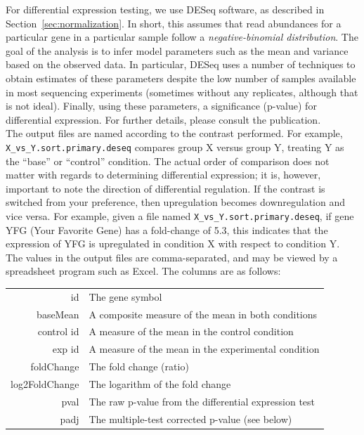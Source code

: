 \documentclass{article}
\begin{document}
{{{For differential expression testing, we use DESeq software, as described in Section~\ref{sec:normalization}.  In short, this assumes that read abundances for a particular gene in a particular sample follow a \emph{negative-binomial distribution}.  The goal of the analysis is to infer model parameters such as the mean and variance based on the observed data.  In particular, DESeq uses a number of techniques to obtain estimates of these parameters despite the low number of samples available in most sequencing experiments (sometimes without any replicates, although that is not ideal).  Finally, using these parameters, a significance (p-value) for differential expression. For further details, please consult the publication.\\  

The output files are named according to the contrast performed.  For example, \verb|X_vs_Y.sort.primary.deseq| compares group X versus group Y, treating Y as the ``base'' or ``control'' condition.  The actual order of comparison does not matter with regards to determining differential expression; it is, however, important to note the direction of differential regulation.  If the contrast is switched from your preference, then upregulation becomes downregulation and vice versa.  For example, given a file named \verb|X_vs_Y.sort.primary.deseq|, if gene YFG (Your Favorite Gene) has a fold-change of 5.3, this indicates that the expression of YFG is upregulated in condition X with respect to condition Y.  \\

The values in the output files are comma-separated, and may be viewed by a spreadsheet program such as Excel.  The columns are as follows:
\begin{center}
\begin{tabular}{r|l}
id & The gene symbol \\
baseMean & A composite measure of the mean in both conditions  \\
\textlangle{}control id\textrangle{} & A measure of the mean in the control condition \\
\textlangle{}exp id\textrangle{} & A measure of the mean in the experimental condition \\
foldChange & The fold change (ratio)\\
log2FoldChange & The logarithm of the fold change \\
pval & The raw p-value from the differential expression test \\
padj & The multiple-test corrected p-value (see below)
\end{tabular}
\end{center}

}}}
\end{document}
